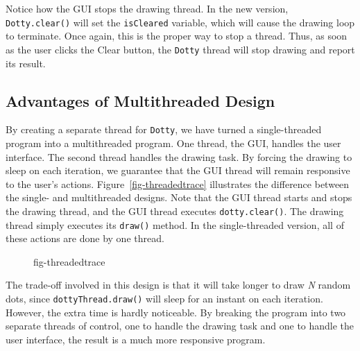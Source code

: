 Notice how the GUI stops the drawing thread.  In the new version, {\tt
Dotty.clear()} will set the {\tt isCleared} variable, which will cause
the drawing loop to terminate.  Once again, this is the proper way to
stop a thread.  Thus, as soon as the user clicks the Clear button, the
{\tt Dotty} thread will stop drawing and report its result.


\subsection{Advantages of Multithreaded Design}
\noindent By creating a separate thread for {\tt Dotty}, we have turned
a single-threaded program into a multithreaded program.   One thread,
the GUI, handles the user interface.  The second thread handles the
drawing task.  By forcing the drawing to sleep on each iteration, we
guarantee that the GUI thread will remain responsive to the user's
actions.  Figure~\ref{fig-threadedtrace} illustrates the difference
between the single- and multithreaded designs.  Note that the GUI
thread starts and stops the drawing thread, and the GUI thread
executes {\tt dotty.clear()}.  The drawing thread simply executes its
{\tt draw()} method.  In the single-threaded version, all of these
actions are done by one thread.

\begin{figure}[h!]
 {fig-threadedtrace}

\end{figure}

The trade-off involved in this design is that it will take
longer to draw {\it N} random dots, since {\tt dottyThread.draw()} will
sleep for an instant on each iteration.  However, the extra time is hardly
noticeable.  By breaking the program into two separate threads of
control, one to handle the drawing task and one to handle the user
interface, the result is a much more responsive program.


